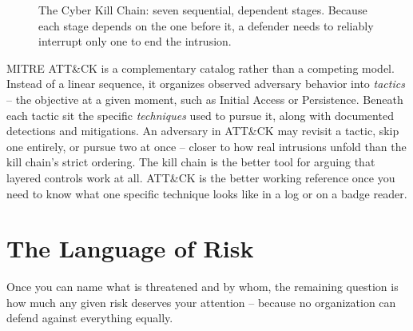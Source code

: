 \begin{figure}[h]
\centering
{}
\caption{The Cyber Kill Chain: seven sequential, dependent stages. Because each stage depends on
the one before it, a defender needs to reliably interrupt only one to end the intrusion.}
\label{fig:2.1-kill-chain}
\end{figure}

MITRE ATT\&CK is a complementary catalog rather than a competing model. Instead of a linear
sequence, it organizes observed adversary behavior into \emph{tactics} -- the objective at a given
moment, such as Initial Access or Persistence. Beneath each tactic sit the specific
\emph{techniques} used to pursue it, along with documented detections and mitigations. An
adversary in ATT\&CK may revisit a tactic, skip one entirely, or pursue two at once -- closer to
how real intrusions unfold than the kill chain's strict ordering. The kill chain is the better tool
for arguing that layered controls work at all. ATT\&CK is the better working reference once you
need to know what one specific technique looks like in a log or on a badge reader.

\section{The Language of Risk}

Once you can name what is threatened and by whom, the remaining question is how much any given
risk deserves your attention -- because no organization can defend against everything equally.

